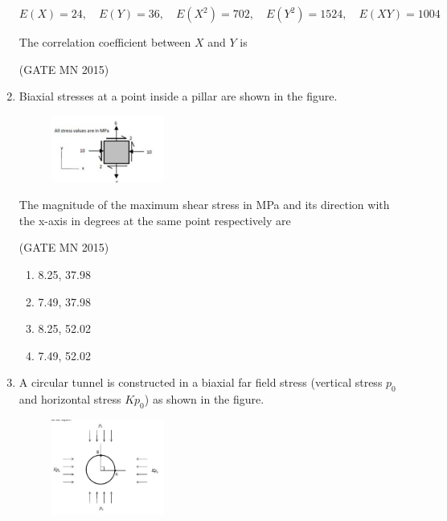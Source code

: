 \documentclass[journal]{IEEEtran}
\begin{document}
\begin{enumerate}
\[
E(X) = 24, \quad E(Y) = 36, \quad E(X^2) = 702, \quad E(Y^2) = 1524, \quad E(XY) = 1004
\]

The correlation coefficient between $X$ and $Y$ is \underline{\hspace{2cm}}  

\hfill(GATE MN 2015)


\item Biaxial stresses at a point inside a pillar are shown in the figure.  

\begin{figure}[H]                             
\centering
\includegraphics[width=0.35\textwidth]{Screenshot_2025_0818_084551.png} 
\caption{}                                    
\label{fig:Q59}                           
\end{figure}

The magnitude of the maximum shear stress in MPa and its direction with the x-axis in degrees at the same point respectively are  

\hfill(GATE MN 2015)

\begin{multicols}{2}
\begin{enumerate}
\item 8.25, 37.98  
\item 7.49, 37.98  
\item 8.25, 52.02  
\item 7.49, 52.02  
\end{enumerate}
\end{multicols}

 

\item A circular tunnel is constructed in a biaxial far field stress (vertical stress $p_0$ and horizontal stress $Kp_0$) as shown in the figure.  

\begin{figure}[H]                             
\centering
\includegraphics[width=0.35\textwidth]{Screenshot_2025_0818_084354.png} 
\caption{}                                      
\label{fig:Q60}                            
\end{figure}


\end{enumerate}
\end{document}
